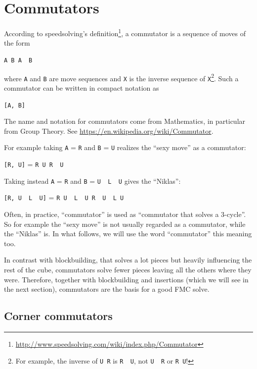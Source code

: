 \documentclass[11pt,a4paper]{book}
\newcommand{\p}{\textquotesingle}
\newcommand{\m}{\texttt}
\newcommand{\ps}{\p\,\,}
\begin{document}
\section{Commutators}

According to speedsolving's definition\footnote{\url{http://www.speedsolving.com/wiki/index.php/Commutator}}, a commutator is a sequence of moves of the form

\begin{center}
\m{A B A\ps B\p}
\end{center}

where \m A and \m B are move sequences and \m{X\p} is the inverse sequence of \m X\footnote{For example, the inverse of \m{U R} is \m{R\ps U\p}, not \m{U\ps R\p} or \m{R U}!}. Such a commutator can be written in compact notation as

\begin{center}
\m{[A, B]}
\end{center}

The name and notation for commutators come from Mathematics, in particular from Group Theory. See \url{https://en.wikipedia.org/wiki/Commutator}.

For example taking \m{A} = \m{R} and \m{B} = \m{U} realizes the ``sexy move'' as a commutator:
\begin{center}
\m{[R, U]} = \m{R U R\ps U\p}
\end{center}

Taking instead \m A = \m R and \m B = \m{U\ps L\ps U} gives the ``Niklas'':

\begin{center}
\m{[R, U\ps L\ps U]} = \m{R U\ps L\ps U R\ps U\ps L U}
\end{center}

Often, in practice, ``commutator'' is used as ``commutator that solves a 3-cycle''. So for example the ``sexy move'' is not usually regarded as a commutator, while the ``Niklas'' is. In what follows, we will use the word ``commutator'' this meaning too.

In contrast with blockbuilding, that solves a lot pieces but heavily influencing the rest of the cube, commutators solve fewer pieces leaving all the others where they were. Therefore, together with blockbuilding and insertions (which we will see in the next section), commutators are the basis for a good FMC solve.

\subsection{Corner commutators}
\end{document}

